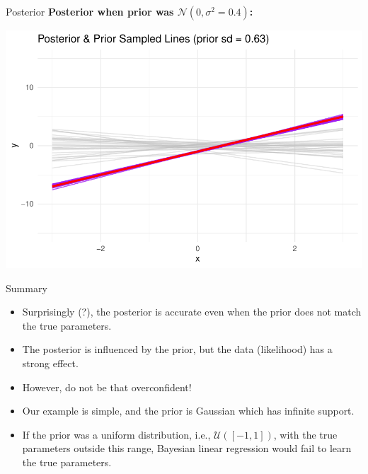 \documentclass{beamer}
\begin{document}
\begin{frame}{Posterior}
  \textbf{Posterior when prior was \(\mathcal{N}(0, \sigma^2=0.4)\):}

  \begin{center}
    \includegraphics[width=0.8\linewidth]{posterior_lines_3.pdf}
  \end{center}
\end{frame}

\begin{frame}{Summary}
  \begin{itemize}
  \item Surprisingly (?), the posterior is accurate even when the prior does not match the true parameters.
  \item The posterior is influenced by the prior, but the data (likelihood) has a strong effect.
  \item However, do not be that overconfident!
  \item Our example is simple, and the prior is Gaussian which has infinite support.
  \item If the prior was a uniform distribution, i.e., $\mathcal{U}([-1, 1])$, with the true parameters outside this range, Bayesian linear regression would fail to learn the true parameters.
  \end{itemize}
\end{frame}
\end{document}
